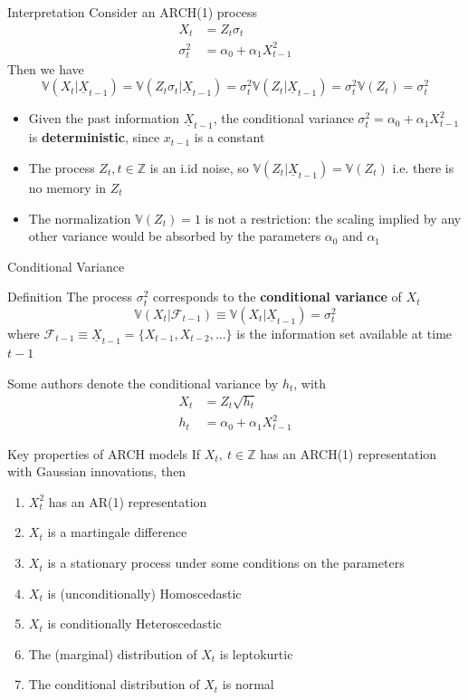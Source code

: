 \documentclass{beamer}
\def\Z{\mathbb{Z}}
\def\Var{\mathbb{V}}
\def\F{\mathcal{F}}
\newcommand{\imfbold}[1]{\textbf{\textcolor{imfblue}{#1}}}
\begin{document}
\begin{frame}{Interpretation}
Consider an ARCH(1) process 
\begin{align*}
    X_t & = Z_t\sigma_t\\
    \sigma_t^2 &= \alpha_0 +\alpha_1X_{t-1}^2
\end{align*}
Then we have 
$$ \Var(X_t|\underline{X}_{t-1}) = \Var(Z_t\sigma_t|\underline{X}_{t-1}) = \sigma_t^2\Var(Z_t|\underline{X}_{t-1}) =\sigma_t^2\Var(Z_t) = \sigma_t^2$$
       \begin{itemize}
           \item Given the past information $\underline{X}_{t-1}$, the conditional variance $\sigma_t^2 = \alpha_0 +\alpha_1X_{t-1}^2$ is \imfbold{ deterministic}, since $x_{t-1}$ is a constant
           \item The process {$Z_t, t\in \Z$} is an i.id noise, so $\Var(Z_t|\underline{X}_{t-1}) = \Var(Z_t)$ i.e. there is no memory in $Z_t$
           \item The normalization $\Var(Z_t)=1$ is not a restriction: the scaling implied by any other variance would be absorbed by the parameters $\alpha_0$ and $\alpha_1$
       \end{itemize}
\end{frame}

\begin{frame}{Conditional Variance}
    \begin{block}{Definition}
        The process $\sigma_t^2$ corresponds to the \textbf{conditional variance} of $X_t$
        $$\Var(X_t|\F_{t-1}) \equiv \Var(X_t|\underline{X}_{t-1}) = \sigma_t^2 $$
        where $\F_{t-1} \equiv \underline{X}_{t-1} = \{X_{t-1}, X_{t-2}, ... \}$ is the information set available at time $t-1$
    \end{block}
    \vspace{2pt}
    Some authors denote the conditional variance by $h_t$, with 
    \begin{align*}
        X_t &= Z_t\sqrt{h_t}\\
        h_t & = \alpha_0 +\alpha_1X_{t-1}^2
    \end{align*}  
\end{frame}
\begin{frame}{Key properties of ARCH models}
If {$X_t,~t \in \Z$} has an ARCH(1) representation with Gaussian innovations, then
\begin{enumerate}
    \item $X_t^2$ has an AR(1) representation
    \item $X_t$ is a martingale difference
    \item $X_t$ is a stationary process under some conditions on the parameters
    \item $X_t$ is (unconditionally) Homoscedastic
    \item $X_t$ is conditionally Heteroscedastic
    \item The (marginal) distribution of $X_t$ is leptokurtic
    \item The conditional distribution of $X_t$ is normal    
\end{enumerate}
\end{frame}
\end{document}
